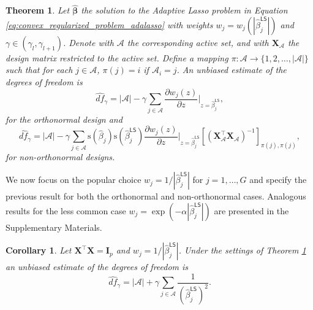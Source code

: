 \documentclass[a4paper, 12pt]{article}
\newcommand{\Aset}{\mathcal{A}}
\newcommand{\sgn}{\mathrm{s}}
\newcommand{\betahat}{\widehat{\boldsymbol\beta}}
\newcommand{\trace}{\mathrm{trace}}
\newcommand{\T}{\top}
\def\by{\boldsymbol{y}}
\def\bI{\mathbf{I}}
\def\bX{\mathbf{X}}
\def\by{\mathbf{y}}
\newtheorem{theorem}{Theorem}
\newtheorem{corollary}{Corollary}
\begin{document}
\begin{theorem}
\label{th:df_adalasso_general_weights}
Let $\betahat$ the solution to the Adaptive Lasso problem in Equation \eqref{eq:convex_regularized_problem_adalasso} with weights  $w_j = w_j(|\widehat{\beta}_j^\mathsf{LS}|)$ and $\gamma \in (\gamma_l, \gamma_{l+1})$. Denote with $\Aset$ the corresponding active set, and with $\bX_{\Aset}$ the design matrix restricted to the active set. 
%
Define a mapping $\pi: \Aset \rightarrow\{1,2, \ldots,|\Aset|\}$ such that for each $j \in \Aset$, $\pi(j)=i$ if $\Aset_i=j$.
%
An unbiased estimate
of the degrees of freedom is
\begin{equation}
\widehat{df}_\gamma =  |\Aset|-\gamma \sum_{j \in \Aset}  \frac{\partial w_j(z)}{\partial z} \bigg|_{z = \widehat{\beta}_j^\mathsf{LS}},
\end{equation}
for the orthonormal design and
\begin{equation}
    \widehat{df}_\gamma =|\Aset|
    -\gamma \sum_{j \in \Aset} \sgn(\widehat{\beta}_j) \sgn(\widehat{\beta}_j^\mathsf{LS}) \frac{\partial w_j(z)}{\partial z} \bigg|_{z = \widehat{\beta}_j^\mathsf{LS}} 
[(\bX_{\Aset}^{\T} \bX_{\Aset} )^{-1}]_{\pi(j),\pi(j)},
\end{equation}
for non-orthonormal designs.
\end{theorem}
%
\noindent We now focus on the popular choice $w_j=1/|\widehat{\beta}^{\mathsf{LS}}_j|$ for $j=1,\dots,G$ and specify the previous result for both the orthonormal and non-orthonormal cases. Analogous results for the less common case $w_j=\exp(-\alpha |\widehat{\beta}_j^\mathsf{LS}|)$ are presented in %
the Supplementary Materials.
\begin{corollary}
\label{th:df_adalasso_ortho}
    Let $\bX^{\T}\bX=\bI_p$ and $w_j = 1/|\widehat{\beta}_j^{\mathsf{LS}}|$. Under the settings of Theorem \ref{th:df_adalasso_general_weights} an unbiased estimate of the degrees of freedom is
    \begin{equation}
    \label{eq:dof_adalasso_ortho}
        \widehat{df}_\gamma = \vert\Aset\vert+\gamma\sum_{j\in\Aset} 
        \frac{1}{(\widehat{\beta}_j^{\mathsf{LS}})^2}.
    \end{equation}
\end{corollary}
\end{document}
